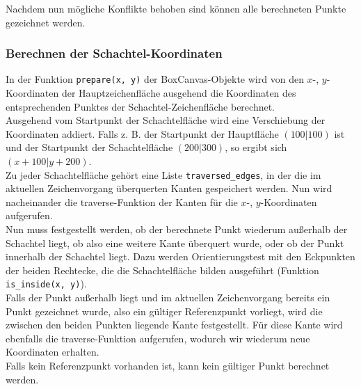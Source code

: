 Nachdem nun mögliche Konflikte behoben sind können alle berechneten Punkte gezeichnet werden.\\


\subsubsection{Berechnen der Schachtel-Koordinaten}
\label{subsubsec:schachtelkoordinaten}

In der Funktion \texttt{prepare(x, y)} der BoxCanvas-Objekte wird von den $x$-, $y$-Koordinaten der Hauptzeichenfläche ausgehend die Koordinaten des entsprechenden Punktes der Schachtel-Zeichenfläche berechnet.\\

Ausgehend vom Startpunkt der Schachtelfläche wird eine Verschiebung der Koordinaten addiert. Falls z. B. der Startpunkt der Hauptfläche $(100|100)$ ist und der Startpunkt der Schachtelfläche $(200|300)$, so ergibt sich $(x+100|y+200)$.\\

Zu jeder Schachtelfläche gehört eine Liste \texttt{traversed\_edges}, in der die im aktuellen Zeichenvorgang überquerten Kanten gespeichert werden. Nun wird nacheinander die traverse-Funktion der Kanten für die $x$-, $y$-Koordinaten aufgerufen.\\

Nun muss festgestellt werden, ob der berechnete Punkt wiederum außerhalb der Schachtel liegt, ob also eine weitere Kante überquert wurde, oder ob der Punkt innerhalb der Schachtel liegt. Dazu werden Orientierungstest mit den Eckpunkten der beiden Rechtecke, die die Schachtelfläche bilden ausgeführt (Funktion \texttt{is\_inside(x, y)}).\\

Falls der Punkt außerhalb liegt und im aktuellen Zeichenvorgang bereits ein Punkt gezeichnet wurde, also ein gültiger Referenzpunkt vorliegt, wird die zwischen den beiden Punkten liegende Kante festgestellt. Für diese Kante wird ebenfalls die traverse-Funktion aufgerufen, wodurch wir wiederum neue Koordinaten erhalten.\\

Falls kein Referenzpunkt vorhanden ist, kann kein gültiger Punkt berechnet werden.\\

